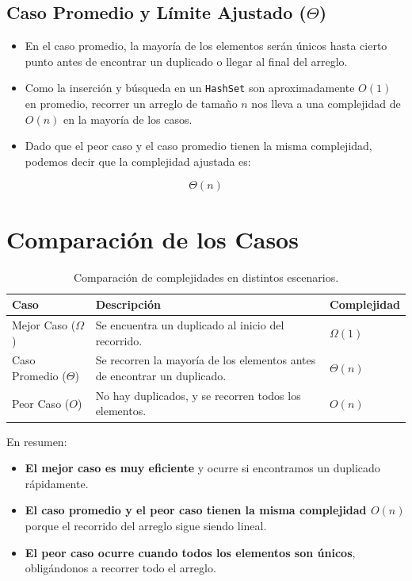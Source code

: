 \documentclass{article}
\begin{document}
	\subsection{Caso Promedio y Límite Ajustado ($\Theta$)}
	\begin{itemize}
		\item En el caso promedio, la mayoría de los elementos serán únicos hasta cierto punto antes de encontrar un duplicado o llegar al final del arreglo.
		\item Como la inserción y búsqueda en un \texttt{HashSet} son aproximadamente $O(1)$ en promedio, recorrer un arreglo de tamaño $n$ nos lleva a una complejidad de $O(n)$ en la mayoría de los casos.
		\item Dado que el peor caso y el caso promedio tienen la misma complejidad, podemos decir que la complejidad ajustada es:
	\end{itemize}
	\begin{equation}
		\Theta(n)
	\end{equation}
	
	\section{Comparación de los Casos}
	\begin{table}[h]
		\centering
		\begin{tabular}{lll}
			\toprule
			\textbf{Caso} & \textbf{Descripción} & \textbf{Complejidad} \\
			\midrule
			Mejor Caso ($\Omega$) & Se encuentra un duplicado al inicio del recorrido. & $\Omega(1)$ \\
			Caso Promedio ($\Theta$) & Se recorren la mayoría de los elementos antes de encontrar un duplicado. & $\Theta(n)$ \\
			Peor Caso ($O$) & No hay duplicados, y se recorren todos los elementos. & $O(n)$ \\
			\bottomrule
		\end{tabular}
		\caption{Comparación de complejidades en distintos escenarios.}
	\end{table}
	
	En resumen:
	\begin{itemize}
		\item \textbf{El mejor caso es muy eficiente} y ocurre si encontramos un duplicado rápidamente.
		\item \textbf{El caso promedio y el peor caso tienen la misma complejidad $O(n)$} porque el recorrido del arreglo sigue siendo lineal.
		\item \textbf{El peor caso ocurre cuando todos los elementos son únicos}, obligándonos a recorrer todo el arreglo.
	\end{itemize}
	
\end{document}
